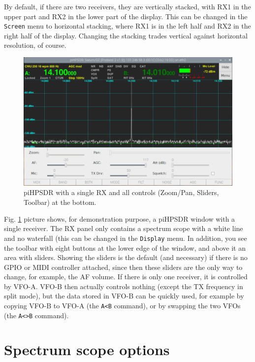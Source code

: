 \documentclass[12pt]{book}
\begin{document}
 By default, if there are two receivers, they are vertically stacked,
 with RX1 in the upper part and RX2 in the lower part of the display.
 This can be changed in the \texttt{Screen} menu to horizontal stacking,
 where RX1 is  in the left half and RX2 in the right half of  the 
 display. Changing the stacking trades vertical against horizontal
 resolution, of course.
 
  
\begin{figure}[h]
\center
\includegraphics[width=12cm]{SingleReceiver.png}
\caption{piHPSDR with a single RX and all controls (Zoom/Pan,
Sliders, Toolbar) at the  bottom.}
\label{fig:SingleReceiver}
\end{figure}

 Fig. \ref{fig:SingleReceiver} picture shows, for demonstration purpose, a piHPSDR
 window with a single receiver. 
 The RX panel only contains a
 spectrum scope with a white line and no waterfall (this can be changed in the
 \texttt{Display} menu. In addition, you see the toolbar
 with eight buttons at the lower edge of the window, and above
 it an area with sliders. Showing the sliders is the default
 (and necessary) if there is no GPIO or MIDI controller attached,
 since then these sliders are the only way to change, for example,
 the AF volume. If there is only one receiver, it is controlled
 by VFO-A. VFO-B then actually controls nothing (except the TX
 frequency in split mode), but the data stored in VFO-B can
 be quickly used, for example by copying VFO-B to VFO-A (the
 \texttt{A<B} command), or by swapping the two VFOs (the
 \texttt{A<>B} command).

\section{Spectrum scope options}
\end{document}

